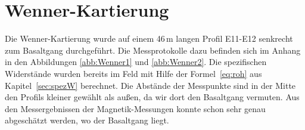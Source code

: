 \section{Wenner-Kartierung}

Die Wenner-Kartierung wurde auf einem 46\,m langen Profil E11-E12 senkrecht zum Basaltgang durchgeführt. Die Messprotokolle dazu befinden sich im Anhang in den Abbildungen  \ref{abb:Wenner1} und \ref{abb:Wenner2}. 
Die spezifischen Widerstände wurden bereits im Feld mit Hilfe der Formel~\eqref{eq:roh} aus Kapitel~\ref{sec:spezW} berechnet.
Die Abstände
der Messpunkte sind in der Mitte den Profils kleiner gewählt als außen, da wir dort den Basaltgang vermuten. Aus den Messergebnissen der Magnetik-Messungen konnte schon sehr genau abgeschätzt werden, wo der Basaltgang liegt.

